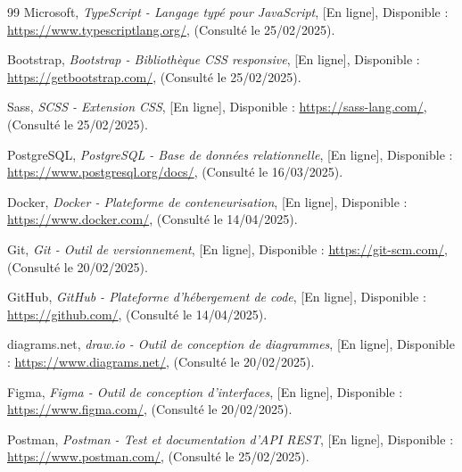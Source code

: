 \documentclass[12pt,a4paper]{report}
\begin{document}
\begin{thebibliography}{99}
 Microsoft, \textit{TypeScript - Langage typé pour JavaScript}, [En ligne], Disponible : \url{https://www.typescriptlang.org/}, (Consulté le 25/02/2025).

 Bootstrap, \textit{Bootstrap - Bibliothèque CSS responsive}, [En ligne], Disponible : \url{https://getbootstrap.com/}, (Consulté le 25/02/2025).

 Sass, \textit{SCSS - Extension CSS}, [En ligne], Disponible : \url{https://sass-lang.com/}, (Consulté le 25/02/2025).



 PostgreSQL, \textit{PostgreSQL - Base de données relationnelle}, [En ligne], Disponible : \url{https://www.postgresql.org/docs/}, (Consulté le 16/03/2025).



 Docker, \textit{Docker - Plateforme de conteneurisation}, [En ligne], Disponible : \url{https://www.docker.com/}, (Consulté le 14/04/2025).



 Git, \textit{Git - Outil de versionnement}, [En ligne], Disponible : \url{https://git-scm.com/}, (Consulté le 20/02/2025).

 GitHub, \textit{GitHub - Plateforme d'hébergement de code}, [En ligne], Disponible : \url{https://github.com/}, (Consulté le 14/04/2025).



 diagrams.net, \textit{draw.io - Outil de conception de diagrammes}, [En ligne], Disponible : \url{https://www.diagrams.net/}, (Consulté le 20/02/2025).

 Figma, \textit{Figma - Outil de conception d'interfaces}, [En ligne], Disponible : \url{https://www.figma.com/}, (Consulté le 20/02/2025).

 Postman, \textit{Postman - Test et documentation d'API REST}, [En ligne], Disponible : \url{https://www.postman.com/}, (Consulté le 25/02/2025).



\end{thebibliography}
\end{document}
